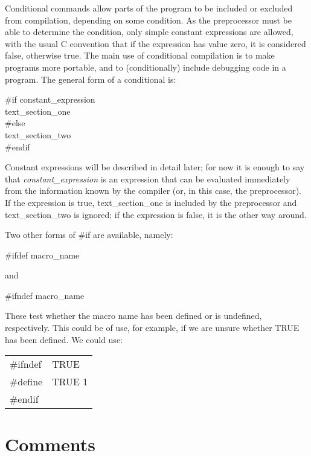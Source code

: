      Conditional commands  allow parts  of  the  program  to  be 
included  or excluded from  compilation, depending  on some 
condition. As the preprocessor must be  able to determine the
condition, only simple constant expressions are allowed, with the
usual C convention that if the expression has value zero, it is
considered false, otherwise true. The main use of conditional
compilation is to make programs more portable, and to (conditionally)
include debugging code in a program.  The general form of a
conditional is:
\begin{code}
\#if {\ms constant\_expression\/} \\
 \> {\ms text\_section\_one\/} \\
\#else \\
 \> {\ms text\_section\_two\/} \\
\#endif
\end{code}
\noindent
Constant expressions will be described in detail later; for now it is
enough to say that {\em constant\_expression\/} is an expression that can be
evaluated immediately from  the   information  known   by  the 
compiler  (or,  in  this  case,  the preprocessor). If  the
expression  is true,  {\ms text\_section\_one\/} is included by
the preprocessor  and {\ms text\_section\_two\/}  is ignored; if
the  expression  is false, it is the other way around.

Two other forms of {\cd \#if} are available, namely:
\begin{code}
\#ifdef  {\ms macro\_name\/}
\end{code}
\noindent
and
\begin{code}
\#ifndef {\ms macro\_name\/}
\end{code}
\noindent
These test  whether the  macro name  has been  defined or  is 
undefined, respectively. This could be of use, for example, if we are
unsure whether {\cd TRUE} has been defined. We could use:
\begin{display}\cd
\begin{tabular}{@{}ll@{}}
  \#ifndef &  TRUE \\
  \#define &  TRUE 1 \\
  \#endif &
\end{tabular}
\end{display}
     

\section{Comments}


